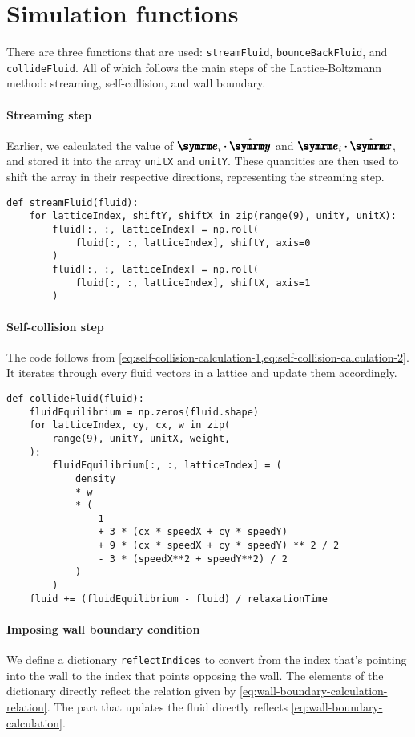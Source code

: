 \section{Simulation functions}
\label{sec:simulation-function}

There are three functions that are used: \texttt{streamFluid}, \texttt{bounceBackFluid}, and \texttt{collideFluid}. All of which follows the main steps of the Lattice-Boltzmann method: streaming, self-collision, and wall boundary.

\paragraph{Streaming step} Earlier, we calculated the value of $\vv{e}_i\vdot\yhat$ and $\vv{e}_i\vdot\xhat$, and stored it into the array \texttt{unitX} and \texttt{unitY}. These quantities are then used to shift the array in their respective directions, representing the streaming step.
\begin{verbatim}
def streamFluid(fluid):
    for latticeIndex, shiftY, shiftX in zip(range(9), unitY, unitX):
        fluid[:, :, latticeIndex] = np.roll(
            fluid[:, :, latticeIndex], shiftY, axis=0
        )
        fluid[:, :, latticeIndex] = np.roll(
            fluid[:, :, latticeIndex], shiftX, axis=1
        )
\end{verbatim}

\paragraph{Self-collision step} The code follows from \cref{eq:self-collision-calculation-1,eq:self-collision-calculation-2}. It iterates through every fluid vectors in a lattice and update them accordingly.
\begin{verbatim}
def collideFluid(fluid):
    fluidEquilibrium = np.zeros(fluid.shape)
    for latticeIndex, cy, cx, w in zip(
        range(9), unitY, unitX, weight,
    ):
        fluidEquilibrium[:, :, latticeIndex] = (
            density
            * w
            * (
                1
                + 3 * (cx * speedX + cy * speedY)
                + 9 * (cx * speedX + cy * speedY) ** 2 / 2
                - 3 * (speedX**2 + speedY**2) / 2
            )
        )
    fluid += (fluidEquilibrium - fluid) / relaxationTime
\end{verbatim}

\paragraph{Imposing wall boundary condition} We define a dictionary \texttt{reflectIndices} to convert from the index that's pointing into the wall to the index that points opposing the wall. The elements of the dictionary directly reflect the relation given by \cref{eq:wall-boundary-calculation-relation}. The part that updates the fluid directly reflects \cref{eq:wall-boundary-calculation}.

